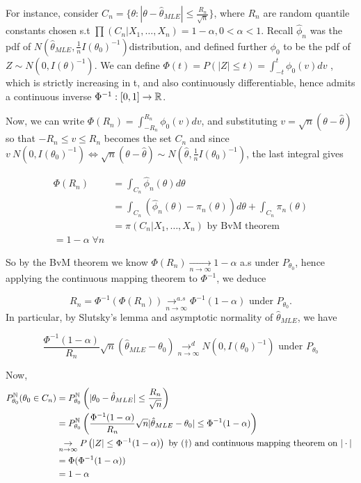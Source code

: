 \documentclass[a4paper]{article}
\begin{document}
For instance, consider $C_n = \{\theta : |\theta - \hat{\theta}_{MLE}| \le \frac{R_n}{\sqrt{n} }\} $, where $R_n$ are random quantile constants chosen s.t $\prod (C_n | X_1,\ldots,X_n) = 1- \alpha, 0 < \alpha < 1$. Recall $\hat{\phi}_n$ was the pdf of $N(\hat{\theta}_{MLE}, \frac{1}{n}I(\theta_0)^{-1})$distribution, and defined further $\phi_0$ to be the pdf of $Z\sim N(0, I(\theta)^{-1})$. We can define $\Phi(t) = P\left( |Z| \le t \right) = \int_{-t}^{t} \phi_0 (v) dv$ , which is strictly increasing in t, and also continuously differentiable, hence admits a continuous inverse $\Phi ^{-1} : [0,1] \to \mathbb{R}$.

Now, we can write $\Phi (R_n) = \int_{-R_n}^{R_n} \phi_0(v)dv$, and substituting $v = \sqrt{n} (\theta - \hat{\theta})$ so that $-R_n \le v \le R_n$ becomes the set $C_n$ and since $v ~ N(0, I(\theta_0)^{-1}) \iff \sqrt{n} (\theta - \hat{\theta}) \sim N(\hat{\theta}, \frac{1}{n}I(\theta_0)^{-1})$, the last integral gives

\begin{align*}
	\Phi(R_n) &= \int_{C_n} \hat{\phi}_n (\theta) d\theta \\
	&= \int_{C_n} (\hat{\phi}_n(\theta) - \pi_n(\theta)) d\theta + \int_{C_n} \pi_n(\theta) \\
	&= \pi (C_n |X_1, \ldots, X_n) \text{ by BvM theorem} \\
	= 1 - \alpha \; \forall n
\end{align*} 

So by the BvM theorem we know $\Phi(R_n) \underset{n\to \infty}{\to } 1 - \alpha$ a.s under $P_{\theta_0}$, hence applying the continuous mapping theorem to $\Phi ^{-1}$, we deduce

\[
	R_n = \Phi ^{-1}(\Phi(R_n)) \underset{n\to \infty}{\to ^{a.s}} \Phi ^{-1}(1-\alpha) \text{ under } P_{\theta_0}.
\] 
In particular, by Slutsky's lemma and asymptotic normality of $\hat{\theta}_{MLE}$, we have 

\[
	\frac{\Phi ^{-1} (1- \alpha)}{R_n}\sqrt{n} (\hat{\theta}_{MLE} - \theta_0) \underset{n\to \infty}{\to ^{d}} N(0, I(\theta_0)^{-1}) \text{ under } P_{\theta_0}
\] 

Now,
\begin{align*}
	P_{\theta_0}^{\mathbb{N}} (\theta_0 \in C_n) &= P_{\theta_0}^{\mathbb{N}} \left( |\theta_0 - \hat{\theta}_{MLE} | \le \frac{R_n}{\sqrt{n} }\right) \\
	&= P_{\theta_0}^{\mathbb{N}} \left( \frac{\Phi ^{-1} (1-\alpha)}{R_n} \sqrt{n} |\hat{\theta}_{MLE} - \theta_0| \le \Phi ^{-1}(1-\alpha)  \right)  \\
	&\underset{n\to \infty}{\to} P\left( |Z| \le \Phi ^{-1} (1- \alpha) \right) \text{ by $(\dagger)$ and continuous mapping theorem on $|\cdot |$ }\\
	&= \Phi (\Phi ^{-1} (1-\alpha)) \\
	&= 1 - \alpha
\end{align*}
\end{document}
